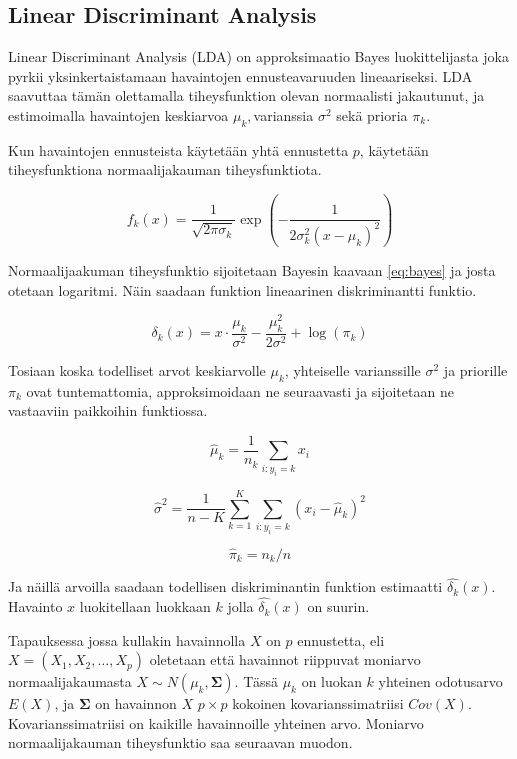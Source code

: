 \documentclass[finnish,twoside,openright]{HYgraduMLDS}
\begin{document}
\subsection{Linear Discriminant Analysis}

Linear Discriminant Analysis (LDA) on approksimaatio Bayes luokittelijasta joka pyrkii yksinkertaistamaan havaintojen ennusteavaruuden lineaariseksi. LDA saavuttaa tämän olettamalla tiheysfunktion olevan normaalisti jakautunut, ja estimoimalla havaintojen keskiarvoa $\mu_k, $varianssia $\sigma^2$ sekä prioria $\pi_k$.

Kun havaintojen ennusteista käytetään yhtä ennustetta $p$, käytetään tiheysfunktiona normaalijakauman tiheysfunktiota.

\begin{equation}
    f_k(x) = \frac{1}{\sqrt{2 \pi \sigma_k}} \exp{(-\frac{1}{2 \sigma^2_k (x - \mu_k)^2})}
\end{equation}

Normaalijaakuman tiheysfunktio sijoitetaan Bayesin kaavaan \ref{eq:bayes} ja josta otetaan logaritmi. Näin saadaan funktion lineaarinen diskriminantti funktio.

\begin{equation}
    \delta_k(x) = x \cdot \frac{\mu_k}{\sigma^2} - \frac{\mu^2_k}{2 \sigma^2} + \log(\pi_k)
\end{equation}

Tosiaan koska todelliset arvot keskiarvolle $\mu_k$, yhteiselle varianssille $\sigma^2$ ja priorille $\pi_k$ ovat tuntemattomia, approksimoidaan ne seuraavasti ja sijoitetaan ne vastaaviin paikkoihin funktiossa.

\begin{equation} \label{eq:estimate-mu}
    \hat{\mu}_k = \frac{1}{n_k} \sum_{i:y_i = k} x_i
\end{equation}

\begin{equation}
    \hat{\sigma}^2 = \frac{1}{n - K} \sum^K_{k=1} \sum_{i:y_i = k} (x_i - \hat{\mu}_k)^2
\end{equation}

\begin{equation} \label{eq:estimate-pi}
    \hat{\pi}_k = n_k / n
\end{equation}

Ja näillä arvoilla saadaan todellisen diskriminantin funktion estimaatti $\hat{\delta_k}(x)$. Havainto $x$ luokitellaan luokkaan $k$ jolla $\hat{\delta_k}(x)$ on suurin.

Tapauksessa jossa kullakin havainnolla $X$ on $p$ ennustetta, eli $X = (X_1, X_2, \dots, X_p)$ oletetaan että havainnot riippuvat moniarvo normaalijakaumasta $X \sim N(\mu_k, \pmb{\Sigma})$. Tässä $\mu_k$ on luokan $k$ yhteinen odotusarvo $E(X)$, ja $\pmb{\Sigma}$ on havainnon $X$ $p \times p$ kokoinen kovarianssimatriisi $Cov(X)$. Kovarianssimatriisi on kaikille havainnoille yhteinen arvo. Moniarvo normaalijakauman tiheysfunktio saa seuraavan muodon.
\end{document}
